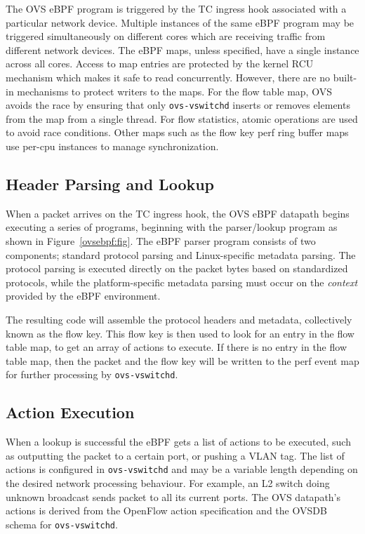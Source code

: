 \documentclass[10pt]{sigplanconf}
\begin{document}
The OVS eBPF program is triggered by the TC ingress hook associated with a
particular network device. Multiple instances of the same eBPF program
may be triggered simultaneously on different cores which are receiving traffic
from different network devices.  The eBPF maps, unless specified, have a single
instance across all cores.  Access to map entries are protected by the kernel
RCU~\cite{rcu} mechanism which makes it safe to read concurrently.  However,
there are no built-in mechanisms to protect writers to the maps.
For the flow table map, OVS avoids the race by ensuring that
only \verb+ovs-vswitchd+ inserts or removes elements from the map from a single
thread.  For flow statistics, atomic operations are used to avoid race
conditions.  Other maps such as the flow key perf ring buffer maps use
per-cpu instances to manage synchronization.

\subsection{Header Parsing and Lookup}
\label{parsing}
When a packet arrives on the TC ingress hook, the OVS eBPF datapath begins
executing a series of programs, beginning with the parser/lookup program
as shown in Figure~\ref{ovsebpf:fig}.  The eBPF parser program
consists of two components; standard protocol parsing and Linux-specific
metadata parsing.  The protocol parsing is executed directly on the packet
bytes based on standardized protocols, while the platform-specific metadata
parsing must occur on the {\em context} provided by the eBPF environment.

The resulting code will assemble the protocol headers and metadata,
collectively known as the flow key. This flow key is then used to look for an
entry in the flow table map, to get an array of actions to execute. If there is
no entry in the flow table map, then the packet and the flow key will be
written to the perf event map for further processing by \verb+ovs-vswitchd+.

\subsection{Action Execution}
\label{execution}
When a lookup is successful the eBPF gets a list of actions to be executed,
such as outputting the packet to a certain port, or pushing a VLAN tag. The
list of actions is configured in \verb+ovs-vswitchd+ and may be a variable
length depending on the desired network processing behaviour. For example, an
L2 switch doing unknown broadcast sends packet to all its current ports.  The
OVS datapath's actions is derived from the OpenFlow action specification and
the OVSDB schema for \verb+ovs-vswitchd+.
\end{document}

